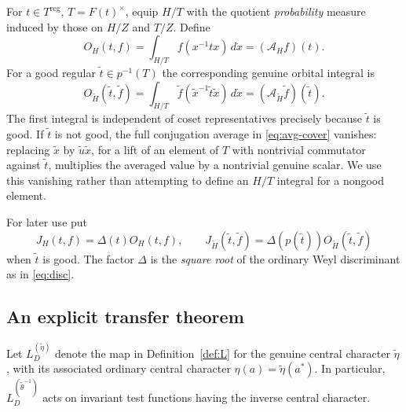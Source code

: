 \documentclass[11pt]{article}
\newcommand{\tH}{\widetilde H}
\newcommand{\reg}{\mathrm{reg}}
\theoremstyle{plain}
\theoremstyle{definition}
\begin{document}
For $t\in T^{\reg}$, $T=F(t)^\times$, equip $H/T$ with the quotient
\emph{probability} measure induced by those on $H/Z$ and $T/Z$. Define
\begin{equation}\label{eq:ordinary-O}
O_H(t,f)=\int_{H/T}f(x^{-1}tx)\,d\dot x
           =(\mathcal A_Hf)(t).
\end{equation}
For a good regular $\widetilde t\in p^{-1}(T)$ the corresponding genuine
orbital integral is
\begin{equation}\label{eq:covered-O}
O_{\tH}(\widetilde t,\widetilde f)
=\int_{H/T}\widetilde f
  (\widetilde x^{-1}\widetilde t\widetilde x)\,d\dot x
=(\mathcal A_{\tH}\widetilde f)(\widetilde t).
\end{equation}
The first integral is independent of coset representatives precisely because
$\widetilde t$ is good. If $\widetilde t$ is not good, the full conjugation
average in \eqref{eq:avg-cover} vanishes: replacing $\widetilde x$ by
$\widetilde u\widetilde x$, for a lift of an element of $T$ with nontrivial
commutator against $\widetilde t$, multiplies the averaged value by a
nontrivial genuine scalar. We use this vanishing rather than attempting to
define an $H/T$ integral for a nongood element.

For later use put
\begin{equation}\label{eq:normalized-O}
J_H(t,f)=\Delta(t)O_H(t,f),\qquad
J_{\tH}(\widetilde t,\widetilde f)
=\Delta(p(\widetilde t))O_{\tH}(\widetilde t,\widetilde f)
\end{equation}
when $\widetilde t$ is good. The factor $\Delta$ is the \emph{square root}
of the ordinary Weyl discriminant as in \eqref{eq:disc}.

\subsection{An explicit transfer theorem}
Let $L_D^{(\widetilde\eta)}$ denote the map in
Definition~\ref{def:L} for the genuine central character
$\widetilde\eta$, with its associated ordinary central character
$\eta(a)=\widetilde\eta(a^*)$. In particular,
$L_D^{(\widetilde\theta^{-1})}$ acts on invariant test functions
having the inverse central character.
\end{document}
